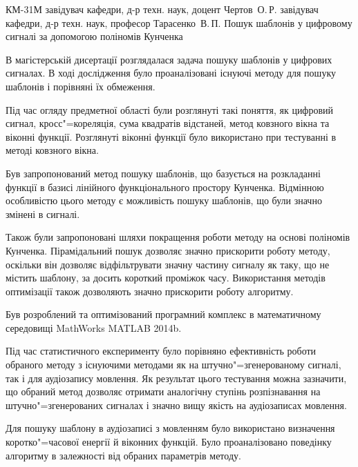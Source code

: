 \documentclass{thesis_utf8}
\begin{document}
    {КМ-31М}
    {завідувач кафедри, д-р техн. наук, доцент Чертов~О.\,Р.}
    {завідувач кафедри, д-р техн. наук, професор Тарасенко~В.\,П.}
    {Пошук шаблонів у цифровому сигналі за допомогою поліномів Кунченка}
\pagestyle{plain}

\tableofcontents









\conclusion{}
В магістерській дисертації розглядалася задача пошуку шаблонів у цифрових сигналах.
В ході дослідження було проаналізовані існуючі методу для пошуку шаблонів і порівняні їх обмеження.

Під час огляду предметної області були розглянуті такі поняття, як цифровий сигнал, кросс"=кореляція, сума квадратів
відстаней, метод ковзного вікна та віконні функції.
Розглянуті віконні функції було використано при тестуванні в методі ковзного вікна.

Був запропонований метод пошуку шаблонів, що базується на розкладанні функції в базисі лінійного функціонального
простору Кунченка.
Відмінною особливістю цього методу є можливість пошуку шаблонів, що були значно змінені в сигналі.

Також були запропоновані шляхи покращення роботи методу на основі поліномів Кунченка.
Пірамідальний пошук дозволяє значно прискорити роботу методу, оскільки він дозволяє відфільтрувати значну частину
сигналу як таку, що не містить шаблону, за досить короткий проміжок часу.
Використання методів оптимізації також дозволяють значно прискорити роботу алгоритму.

Був розроблений та оптимізований програмний комплекс в математичному середовищі MathWorks MATLAB 2014b.

Під час статистичного експерименту було порівняно ефективність роботи обраного методу з існуючими методами як на
штучно"=згенерованому сигналі, так і для аудіозапису мовлення.
Як результат цього тестування можна зазначити, що обраний метод дозволяє отримати аналогічну ступінь розпізнавання на
штучно"=згенерованих сигналах і значно вищу якість на аудіозаписах мовлення.

Для пошуку шаблону в аудіозаписі з мовленням було використано визначення коротко"=часової енергії й віконних функцій.
Було проаналізовано поведінку алгоритму в залежності від обраних параметрів методу.
\end{document}
